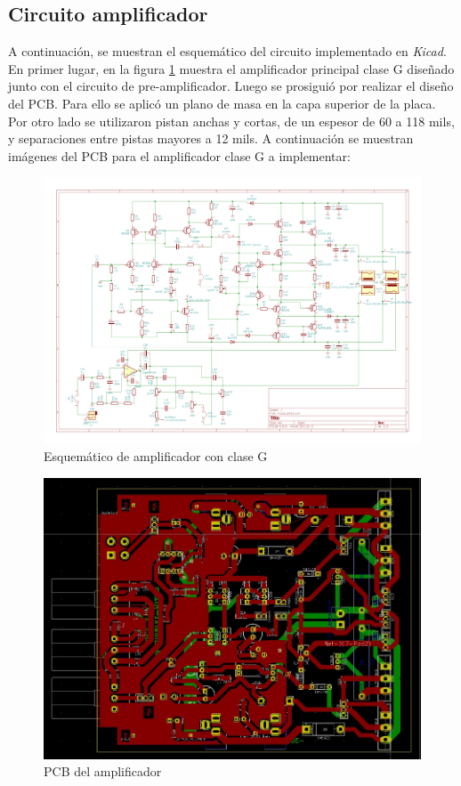 \subsection{Circuito amplificador}


\par A continuación, se muestran el esquemático del circuito implementado en \textit{Kicad}. En primer lugar, en la figura \ref{fig::ampli_kicad} muestra el amplificador principal clase G diseñado junto con el circuito de pre-amplificador. Luego se prosiguió por realizar el diseño del PCB. Para ello se aplicó un plano de masa en la capa superior de la placa. Por otro lado se utilizaron pistan anchas y cortas, de un espesor de 60 a 118 mils, y separaciones entre pistas mayores a 12 mils. A continuación se muestran imágenes del PCB para el amplificador clase G a implementar:\\


\begin{figure}[H]
        \centering
        \includegraphics[scale=0.27]{img/circuito/kicad.png}
        \caption{Esquemático de amplificador con clase G}
        \label{fig::ampli_kicad}
\end{figure}

\begin{figure}[H]
        \centering
        \includegraphics[scale=0.4]{img/circuito/PCB1.jpeg}
        \caption{PCB del amplificador}
        \label{fig::amp_PCB1}
\end{figure}

